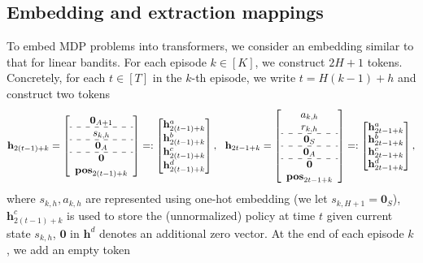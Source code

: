 \documentclass[10pt]{article}
\newcommand{\<}{\left\langle}
\renewcommand{\>}{\right\rangle}
\newcommand{\bzero}{{\mathbf 0}}
\newcommand{\posv}{{\mathbf{pos}}}
\newcommand{\parta}{{a}}
\newcommand{\partb}{{b}}
\newcommand{\partc}{{c}}
\newcommand{\partd}{{d}}
\newcommand{\state}{{s}}
\newcommand{\action}{{a}}
\newcommand{\reward}{{r}}
\newcommand{\totlen}{{T}} %
\newcommand{\Numepi}{{K}}
\newcommand{\horizon}{{H}}
\renewcommand{\horizon}{{H}}
\newcommand{\Numst}{{S}}
\newcommand{\Numact}{{A}}
\def\bh{{\mathbf h}}
\begin{document}
\subsection{Embedding and extraction mappings}\label{sec:tf_embed_mdp}

To embed MDP problems into transformers, we consider an embedding similar to that for linear bandits. For each episode $k\in[\Numepi]$, we construct $2\horizon+1$ tokens. Concretely, for each $t\in[\totlen]$ in the $k$-th episode, we write  $t=\horizon(k-1)+h$  and construct two tokens
\[
\begin{aligned}
\bh_{2(t-1)+k}=
\left[
\begin{array}{cc}
     \bzero_{\Numact+1} \\
     \hdashline 
     \state_{k,h}\\  
      \hdashline 
    \bzero_{\Numact}\\  
    \hdashline  
    \bzero\\
    \posv_{2(t-1)+k}
\end{array}\right]
=:
\begin{bmatrix}
     \bh_{2(t-1)+k}^{\parta} \\  \bh_{2(t-1)+k}^{\partb}\\  \bh_{2(t-1)+k}^{\partc}\\   \bh_{2(t-1)+k}^{\partd}\\
\end{bmatrix},~~
\bh_{2t-1+k}=
\left[
\begin{array}{cc}
     \action_{k,h} \\
      \reward_{k,h}\\  
      \hdashline 
      \bzero_{\Numst}\\ 
      \hdashline 
      \bzero_{\Numact}\\ 
     \hdashline  
      \bzero\\ 
      \posv_{2t-1+k}
\end{array}\right]=:
\begin{bmatrix}
    \bh_{2t-1+k}^{\parta} \\  \bh_{2t-1+k}^{\partb}\\   \bh_{2t-1+k}^{\partc}\\   \bh_{2t-1+k}^{\partd}
\end{bmatrix},
\end{aligned}
\]
where  $\state_{k,h},\action_{k,h}$ are represented using one-hot embedding (we let $\state_{k,\horizon+1}=\bzero_\Numst$), $\bh^\partc_{2(t-1)+k}$ is used to store the (unnormalized)  policy at time  $t$ given current state $\state_{k,h}$, $\bzero$ in $\bh^\partd$ denotes an additional zero vector. At the end of each episode $k$, we add an empty token 
\end{document}
